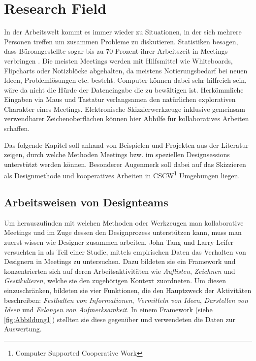 \chapter{Research Field}\label{ch:research}
In der Arbeitswelt kommt es immer wieder zu Situationen, in der sich mehrere Personen treffen um zusammen Probleme zu diskutieren. Statistiken besagen, dass Büroangestellte sogar bis zu 70 Prozent ihrer Arbeitszeit in Meetings verbringen \cite{panko:1993}. Die meisten Meetings werden mit Hilfsmittel wie Whiteboards, Flipcharts oder Notizblöcke abgehalten, da meistens Notierungsbedarf bei neuen Ideen, Problemlösungen etc. besteht. Computer können dabei sehr hilfreich sein, wäre da nicht die Hürde der Dateneingabe die zu bewältigen ist. Herkömmliche Eingaben via Maus und Tastatur verlangsamen den natürlichen explorativen Charakter eines Meetings. Elektronische Skizzierwerkzeuge inklusive gemeinsam verwendbarer Zeichenoberflächen können hier Abhilfe für kollaboratives Arbeiten schaffen. 

\medskip Das folgende Kapitel soll anhand von Beispielen und Projekten aus der Literatur zeigen, durch welche Methoden Meetings bzw. im speziellen Designsessions unterstützt werden können. Besonderer Augenmerk soll dabei auf das Skizzieren als Designmethode und kooperatives Arbeiten in CSCW\footnote{Computer Supported Cooperative Work} Umgebungen liegen.

\section{Arbeitsweisen von Designteams}
Um herauszufinden mit welchen Methoden oder Werkzeugen man kollaborative Meetings und im Zuge dessen den Designprozess unterstützen kann, muss man zuerst wissen wie Designer zusammen arbeiten. John Tang und Larry Leifer versuchten in \cite{Tang:1988p279} als Teil einer Studie, mittels empirischen Daten das Verhalten von Designern in Meetings zu untersuchen. Dazu bildeten sie ein Framework und konzentrierten sich auf deren Arbeitsaktivitäten wie \emph{Auflisten}, \emph{Zeichnen} und \emph{Gestikulieren}, welche sie den zugehörigen Kontext zuordneten. Um diesen einzuschränken, bildeten sie vier Funktionen, die den Hauptzweck der Aktivitäten beschreiben: \emph{Festhalten von Informationen}, \emph{Vermitteln von Ideen}, \emph{Darstellen von Ideen} und \emph{Erlangen von Aufmerksamkeit}. In einem Framework (siehe \autoref{fig:Abbildung1}) stellten sie diese gegenüber und verwendeten die Daten zur Auswertung.

